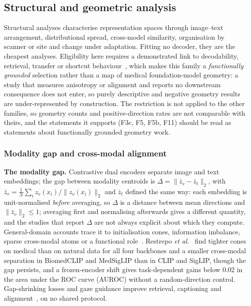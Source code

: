 \subsection{Structural and geometric analysis}
\label{sec:geometry}

Structural analyses characterise representation spaces through image--text arrangement,
distributional spread, cross-model similarity, organisation by scanner or site and change under
adaptation. Fitting no decoder, they are the cheapest analyses. Eligibility here requires a demonstrated
link to decodability, retrieval, transfer or shortcut behaviour~\cite{geirhos2020shortcut}, which makes this family a
\emph{functionally grounded} selection rather than a map of medical foundation-model geometry: a study that
measures anisotropy or alignment and reports no downstream consequence does not enter, so purely descriptive
and negative geometry results are under-represented by construction. The restriction is not applied to the
other families, so geometry counts and positive-direction rates are not comparable with theirs, and the
statements it supports (F3c, F5, F5b, F11) should be read as statements about functionally grounded geometry
work.

\subsubsection{Modality gap and cross-modal alignment}

\textbf{The modality gap.} Contrastive dual encoders separate image and text embeddings; the gap
between modality centroids is $\Delta=\|\bar z_v-\bar z_t\|_2$, with $\bar z_v=\frac{1}{N}\sum_i z_v(x_i)/\|z_v(x_i)\|_2$ and $\bar z_t$ defined the same way: each embedding is unit-normalised \emph{before} averaging, so $\Delta$ is a distance between mean directions and $\|\bar z_v\|_2\le 1$; averaging first and normalising afterwards gives a different quantity, and the studies that report $\Delta$ are not always explicit about which they compute. General-domain
accounts trace it to initialisation cones, information imbalance, sparse cross-modal atoms or a
functional role~\cite{liang2022mind,schrodi2025two,dhimoila2026crossmodal,yan2025beyond}. Restrepo
\emph{et al.}~\cite{restrepo2026cone} find tighter cones on medical than on natural data for all four backbones and a
smaller cross-modal separation in BiomedCLIP and MedSigLIP than in CLIP and SigLIP, though the gap persists, and a frozen-encoder
shift gives task-dependent gains below 0.02 in the area under the ROC curve (AUROC) without a random-direction control. Gap-shrinking losses and gaze guidance improve retrieval, captioning and
alignment~\cite{grassucci2025closing,lahmar2026bridging,kumar2024improving}, on no shared protocol.

